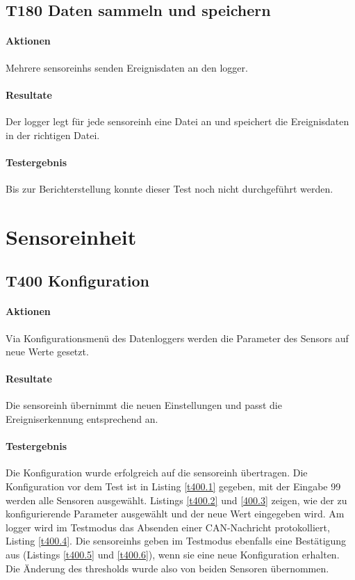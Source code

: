 \subsection{T180 Daten sammeln und speichern}
\paragraph{Aktionen} Mehrere \glspl{sensoreinh} senden Ereignisdaten an den \gls{logger}. 

\paragraph{Resultate} Der \gls{logger} legt für jede \gls{sensoreinh} eine Datei an und speichert die Ereignisdaten in der richtigen Datei.

\paragraph{Testergebnis} Bis zur Berichterstellung konnte dieser Test noch nicht durchgeführt werden.


\section{Sensoreinheit}
\subsection{T400 Konfiguration}
\paragraph{Aktionen} Via Konfigurationsmenü des Datenloggers werden die Parameter des Sensors auf neue Werte gesetzt. 

\paragraph{Resultate} Die \gls{sensoreinh} übernimmt die neuen Einstellungen und passt die Ereigniserkennung entsprechend an.

\paragraph{Testergebnis} Die Konfiguration wurde erfolgreich auf die \gls{sensoreinh} übertragen. Die Konfiguration vor dem Test ist in Listing \ref{t400.1} gegeben, mit der Eingabe 99 werden alle Sensoren ausgewählt. Listings \ref{t400.2} und \ref{400.3} zeigen, wie der zu konfigurierende Parameter ausgewählt und der neue Wert eingegeben wird. Am \gls{logger} wird im Testmodus das Absenden einer CAN-Nachricht protokolliert, Listing \ref{t400.4}. Die \glspl{sensoreinh} geben im Testmodus ebenfalls eine Bestätigung aus (Listings \ref{t400.5} und \ref{t400.6}), wenn sie eine neue Konfiguration erhalten. Die Änderung des \gls{threshold}s wurde also von beiden Sensoren übernommen.

